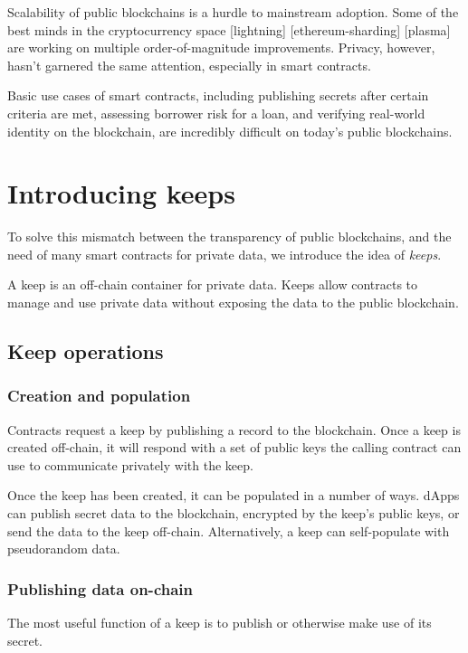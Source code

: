 \documentclass[11pt]{article}
\begin{document}
Scalability of public blockchains is a hurdle to mainstream adoption.
Some of the best minds in the cryptocurrency space [lightning]
[ethereum-sharding] [plasma] are working on multiple
order-of-magnitude improvements. Privacy, however, hasn’t garnered the
same attention, especially in smart contracts.

Basic use cases of smart contracts, including publishing secrets after
certain criteria are met, assessing borrower risk for a loan, and
verifying real-world identity on the blockchain, are incredibly
difficult on today’s public blockchains.

\section{Introducing keeps}

To solve this mismatch between the transparency of public blockchains,
and the need of many smart contracts for private data, we introduce
the idea of {\em keeps}.

A keep is an off-chain container for private data. Keeps allow
contracts to manage and use private data without exposing the data to
the public blockchain.

\subsection{Keep operations}

\subsubsection{Creation and population}

Contracts request a keep by publishing a record to the blockchain.
Once a keep is created off-chain, it will respond with a set of public
keys the calling contract can use to communicate privately with the
keep.

Once the keep has been created, it can be populated in a number of
ways. dApps can publish secret data to the blockchain, encrypted by
the keep’s public keys, or send the data to the keep off-chain.
Alternatively, a keep can self-populate with pseudorandom data.

\subsubsection{Publishing data on-chain}

The most useful function of a keep is to publish or otherwise make use
of its secret.
\end{document}
